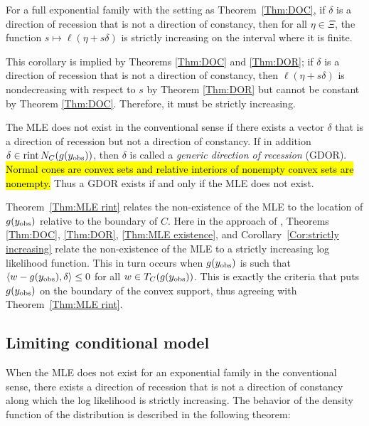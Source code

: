 \begin{corollary} \label{Cor:strictly increasing}
For a full exponential family with the setting as Theorem~\ref{Thm:DOC}, if $\delta$ is a
direction of recession that is not a direction of constancy, 
then for all $\eta \in \Xi$, the function $s \mapsto \ell(\eta+s\delta)$ is strictly
increasing on the interval where it is finite.
\end{corollary}

This corollary is implied by Theorems \ref{Thm:DOC} and \ref{Thm:DOR}; if
$\delta$ is a direction of recession that is not a direction of constancy, 
then $\ell(\eta+s\delta)$ is nondecreasing with respect to $s$ by 
Theorem \ref{Thm:DOR} but cannot be constant by Theorem \ref{Thm:DOC}.  Therefore,
it must be strictly increasing.

The MLE does not exist in the conventional sense if there exists a vector 
$\delta$ that is a direction of recession but not a direction of constancy.  
If in addition $\delta \in \operatorname{rint} N_C(g(y_{\text{obs}}))$, then $\delta$ is called a 
\emph{generic direction of recession} (GDOR).  \hl{Normal cones are convex sets and
relative interiors of nonempty convex sets are nonempty.}  Thus 
a GDOR exists if and only if the MLE does not exist.

Theorem~\ref{Thm:MLE rint} relates the non-existence of the MLE to the location
of $g(y_{\text{obs}})$ relative to the boundary of $C$.  
Here in the approach of \citet{Geyer:gdor}, Theorems \ref{Thm:DOC}, 
\ref{Thm:DOR}, \ref{Thm:MLE existence}, and Corollary~\ref{Cor:strictly increasing} relate the non-existence of the MLE
to a strictly increasing log likelihood function.  This in turn
occurs when $g(y_{\text{obs}})$ is such that $\langle w - g(y_{\text{obs}}), \delta \rangle \leq 0$ for all
$w \in T_C(g(y_{\text{obs}}))$.  This is
exactly the criteria that puts $g(y_{\text{obs}})$ on the boundary of the convex support,
thus agreeing with Theorem~\ref{Thm:MLE rint}.





\subsection{Limiting conditional model} \label{S:LCM}
When the MLE does not exist for an exponential family in the conventional sense, there 
exists a direction of recession that is not a direction of constancy 
along which the log likelihood is strictly increasing.  The behavior of the 
density function of the distribution is described in the following theorem:

